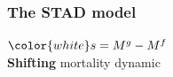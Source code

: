 \documentclass[12pt, xcolor=table]{beamer}  %
\begin{document}
%	
%	
%			
%	
%	
%	
%		
%		
%		
%		
%		
%	

\begin{frame}\frametitle{The STAD model}
\begin{center}
\vspace{-0.1cm}
{\color{white}${\color{white}s}=M^g - M^f$ \\
\textbf{Shifting} mortality dynamic} \\
\end{center}

\end{frame}
\end{document}
